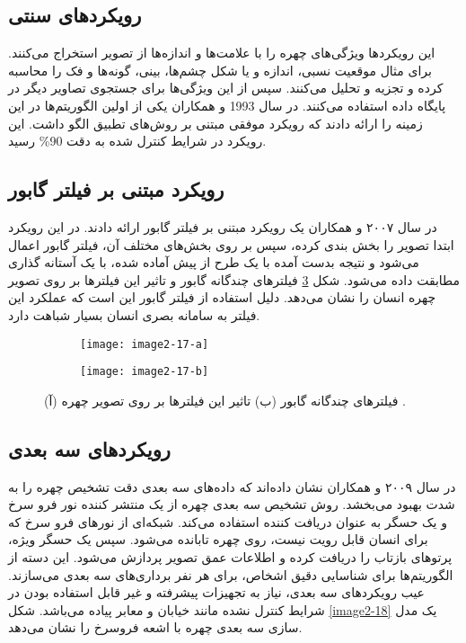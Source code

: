 \subsection{رویکرد‌های سنتی}
این رویکردها ویژگی‌های چهره را با علامت‌ها و اندازه‌ها از تصویر استخراج می‌کنند. برای مثال موقعیت نسبی، اندازه و یا شکل چشم‌ها، بینی، گونه‌‌ها و فک را محاسبه کرده و تجزیه و تحلیل می‌کنند. سپس از این ویژگی‌ها برای جستجوی تصاویر دیگر در پایگاه داده استفاده می‌کنند. در سال 1993  و همکاران \cite{254061} یکی از اولین الگوریتم‌ها در این زمینه را ارائه دادند که رویکرد‌ موفقی مبتنی بر روش‌های تطبیق الگو داشت. این رویکرد در شرایط کنترل شده به دقت 90\% رسید.
 
\subsection{رویکرد مبتنی بر فیلتر گابور ‌}
در سال ۲۰۰۷  و همکاران \cite{ABATE20071885} یک رویکرد مبتنی بر فیلتر گابور ارائه دادند. در این رویکرد ابتدا تصویر را بخش بندی  کرده، سپس بر روی بخش‌های مختلف آن، فیلتر گابور  اعمال می‌شود و نتیجه بدست آمده با یک طرح از پیش آماده شده، با یک آستانه گذاری مطابقت داده می‌شود. شکل \ref{image2-17} فیلترهای چندگانه گابور و تاثیر این فیلترها بر روی تصویر چهره انسان را نشان می‌دهد. دلیل استفاده از فیلتر گابور این است که عملکرد این فیلتر به سامانه بصری انسان بسیار شباهت دارد. 
 	 
\begin{figure}
\begin{subfigure}{.5\textwidth}
  \centering
  \texttt{[image: image2-17-a]}
  \caption{ }
  \label{image2-17-a}
\end{subfigure}
\begin{subfigure}{.5\textwidth}
  \centering
  \texttt{[image: image2-17-b]}
  \caption{ }
  \label{image2-17-b}
\end{subfigure}
  \caption{(آ) فیلترهای چندگانه گابور (ب) تاثیر این فیلترها بر روی تصویر چهره \cite{ABATE20071885}.}
\label{image2-17}
\end{figure}

\subsection{رویکرد‌های سه بعدی}
در سال ۲۰۰۹  و همکاران \cite{10.3745/JIPS.2009.5.2.041} نشان داده‌اند که داده‌های سه بعدی دقت تشخیص چهره را به شدت بهبود می‌بخشد. روش تشخیص سه بعدی چهره از یک منتشر کننده نور فرو سرخ و یک حسگر به عنوان دریافت کننده استفاده می‌کند. شبکه‌ای از نورهای فرو سرخ که برای انسان قابل رویت نیست، روی چهره تابانده می‌شود. سپس یک حسگر ویژه، پرتوهای بازتاب را دریافت کرده و اطلاعات عمق تصویر پردازش می‌شود. این دسته از الگوریتم‌ها برای شناسایی دقیق اشخاص، برای هر نفر برداری‌های سه بعدی می‌سازند. عیب رویکردهای سه بعدی، نیاز به تجهیزات پیشرفته و غیر قابل استفاده بودن در شرایط کنترل نشده مانند خیابان و معابر پیاده می‌باشد. شکل \ref{image2-18} یک مدل سازی سه بعدی چهره با اشعه فروسرخ را نشان می‌دهد.

